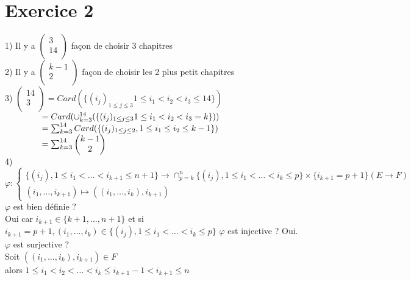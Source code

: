 \documentclass{article}
\author{Frederic Becerril}
\newcommand\tab[1][1cm]{\hspace*{#1}}
\begin{document}
\part*{Exercice 2}

1) Il y a $\begin{pmatrix}
    3\\
    14\\
\end{pmatrix}$ façon de choisir 3 chapitres\\
2) Il y a $\begin{pmatrix}
    k - 1\\
    2\\
\end{pmatrix}$ façon de choisir les 2 plus petit chapitres\\
3) $\begin{pmatrix}
    14\\
    3\\
\end{pmatrix} = Card(\{(i_j)_{1 \leq j \leq 3} 1 \leq i_1 < i_2 < i_3 \leq 14\})$\\
$\tab[1.5cm] = Card(\cup_{k = 3}^{14} (\{(i_j)_{1 \leq j \leq 3} 1 \leq i_1 < i_2 < i_3 = k\}))$\\
$\tab[1.5cm] = \sum_{k = 3}^{14} Card(\{(i_j)_{1 \leq j \leq 2}, 1 \leq i_1 \leq i_2 \leq k - 1\})$\\
$\tab[1.5cm] = \sum_{k = 3}^{14} \begin{pmatrix}
    k - 1\\
    2
\end{pmatrix}$\\
4) $\varphi : \left\{
    \begin{array}{ll}
        \{(i_j), 1 \leq i_1 < \dots < i_{k+1} \leq n + 1\} \rightarrow \cap_{p=k}^n \{(i_j), 1 \leq i_1 < \dots < i_k \leq p\} \times \{i_{k + 1} = p + 1\} (E \rightarrow F)\\
        (i_1, \dots, i_{k+1}) \longmapsto ((i_1, \dots, i_k), i_{k+1})
    \end{array}
\right.$
$\varphi$ est bien définie ?\\
Oui car $i_{k+1} \in \{k + 1, \dots, n+1\}$ et si $i_{k + 1} = p + 1, (i_1, \dots, i_k) \in \{(i_j), 1 \leq i_1 < \dots < i_k \leq p\}$
$\varphi$ est injective ? Oui.\\
$\varphi$ est surjective ?\\
Soit $((i_1, \dots, i_k), i_{k+1}) \in F$\\
alors $1 \leq i_1 < i_2 < \dots < i_k \leq i_{k + 1} - 1 < i_{k + 1} \leq n$\\
\end{document}
